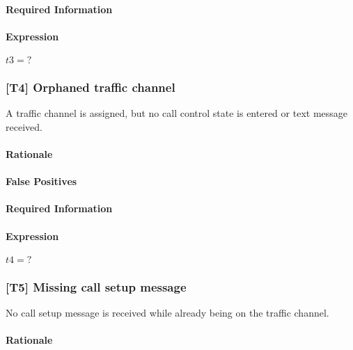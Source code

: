 \documentclass[a4paper,11pt,notitlepage,bigheadings,oneside]{scrartcl}
\begin{document}

\paragraph{Required Information}


\paragraph{Expression}

$t3 = ?$

\subsubsection{[T4] Orphaned traffic channel}

A traffic channel is assigned, but no call control state is entered or text
message received.

\paragraph{Rationale}


\paragraph{False Positives}


\paragraph{Required Information}


\paragraph{Expression}

$t4 = ?$

\subsubsection{[T5] Missing call setup message}

No call setup message is received while already being on the traffic channel.

\paragraph{Rationale}
\end{document}
